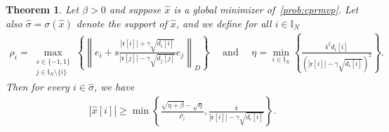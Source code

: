 \documentclass[10pt,a4paper]{amsart}
\newtheorem{theorem}{Theorem}
\newcommand{\II}{{\mathbb I}}
\newcommand{\abs}[1]{\left\lvert#1\right\rvert}
\newcommand{\ccr}{{\mathfrak r}}
\newcommand{\norm}[1]{\left\lVert#1\right\rVert}
\begin{document}
\begin{theorem}
\label{thm:lower-bound}
    Let $\beta>0$ and suppose $\hat{x}$ is a global minimizer of~\eqref{prob:cprmvp}. Let also $\hat{\sigma}=\sigma(\hat{x})$ denote the support of $\hat{x}$, and we define for all $i\in\II_N$
    \begin{align*}
        \rho_i=\max_{\substack{s\in\{-1,1\}\\ j\in \II_N\setminus\{i\}}}\left\{\norm{e_i+s\frac{\abs{\ccr[i]}+\gamma\sqrt{d_i[i]}}{\abs{\ccr[j]}-\gamma\sqrt{d_j[j]}}e_j}_D\right\} \quad\text{ and } \quad\eta=\min_{i\in\II_N}\left\{\frac{\bar{\ccr}^2d_i[i]}{(\abs{\ccr[i]}-\gamma\sqrt{d_i[i]})^2}\right\} .
    \end{align*} Then for every $i\in\hat{\sigma}$, we have
    \begin{align*}
    \abs{\hat{x}[i]}\geq \min\left\{\frac{\sqrt{\eta+\beta}-\sqrt{\eta}}{\rho_i},\frac{\bar{\ccr}}{\abs{\ccr[i]}-\gamma\sqrt{d_i[i]}}\right\}.
\end{align*}
\end{theorem}
\end{document}
